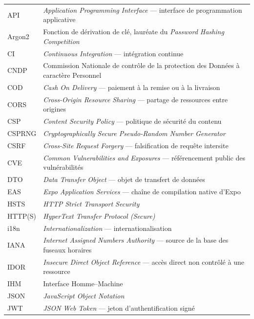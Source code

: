 \begin{center}
\begin{tabularx}{\textwidth}{L{2.6cm} X}
\toprule
{} &  \\
\midrule
API     & \textit{Application Programming Interface} --- interface de programmation applicative\\
Argon2  & Fonction de dérivation de clé, lauréate du \textit{Password Hashing Competition}\\
CI      & \textit{Continuous Integration} --- intégration continue\\
CNDP    & Commission Nationale de contrôle de la protection des Données à caractère Personnel\\
COD     & \textit{Cash On Delivery} --- paiement à la remise ou à la livraison\\
CORS    & \textit{Cross-Origin Resource Sharing} --- partage de ressources entre origines\\
CSP     & \textit{Content Security Policy} --- politique de sécurité du contenu\\
CSPRNG  & \textit{Cryptographically Secure Pseudo-Random Number Generator}\\
CSRF    & \textit{Cross-Site Request Forgery} --- falsification de requête intersite\\
CVE     & \textit{Common Vulnerabilities and Exposures} --- référencement public des vulnérabilités\\
DTO     & \textit{Data Transfer Object} --- objet de transfert de données\\
EAS     & \textit{Expo Application Services} --- chaîne de compilation native d'Expo\\
HSTS    & \textit{HTTP Strict Transport Security}\\
HTTP(S) & \textit{HyperText Transfer Protocol (Secure)}\\
i18n    & \textit{Internationalization} --- internationalisation\\
IANA    & \textit{Internet Assigned Numbers Authority} --- source de la base des fuseaux horaires\\
IDOR    & \textit{Insecure Direct Object Reference} --- accès direct non contrôlé à une ressource\\
IHM     & Interface Homme--Machine\\
JSON    & \textit{JavaScript Object Notation}\\
JWT     & \textit{JSON Web Token} --- jeton d'authentification signé\\

\end{tabularx}
\end{center}
